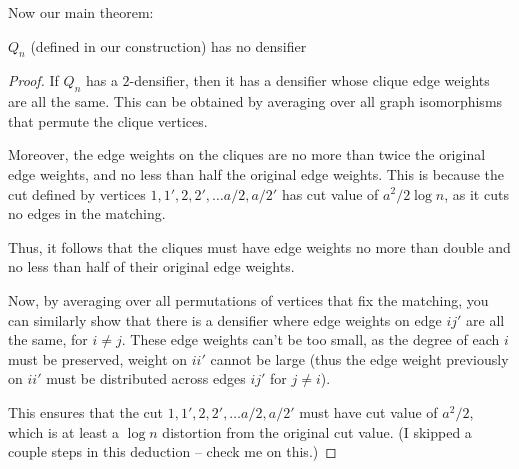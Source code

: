 Now our main theorem:
\begin{theorem} $Q_n$ (defined in our construction) has no
densifier \end{theorem}
\begin{proof} If $Q_n$ has a $2$-densifier, then it has a densifier
  whose clique edge weights are all the same. This can be
  obtained by averaging over all graph isomorphisms that permute
  the clique vertices. 

  Moreover, the edge weights on the cliques are no more than
  twice the original edge weights, and no less than half the
  original edge weights. This is because the cut defined by
  vertices $1, 1', 2, 2', \ldots a/2, a/2'$ has cut value of $a^2 /2
  \log n$, as it cuts no edges in the matching. 

  Thus, it follows that the cliques must have edge weights no
  more than double and no less than half of their original edge
  weights.

  Now, by averaging over all permutations of vertices that fix the matching,
  you can similarly show that there is a densifier where edge
  weights on edge $ij'$ are all the same, for $i\not=j$. These
  edge weights can't be too small, as the degree of each $i$ must
  be preserved, weight on $ii'$ cannot be large (thus the edge
  weight previously on $ii'$ must be distributed across edges
  $ij'$ for $j\not=i$).

  This ensures that the cut $1, 1', 2, 2', \ldots a/2, a/2'$ must
  have cut value of $a^2/2$, which is at least a $\log n$
  distortion from the original cut value. (I skipped a couple steps in this
  deduction -- check me on this.)
\end{proof}



